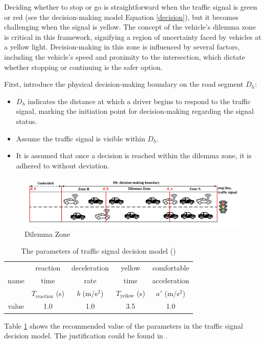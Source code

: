 Deciding whether to stop or go is straightforward when the traffic signal is green or red (see the decision-making model Equation \ref{decision}), but it becomes challenging when the signal is yellow. The concept of the vehicle's dilemma zone is critical in this framework, signifying a region of uncertainty faced by vehicles at a yellow light. Decision-making in this zone is influenced by several factors, including the vehicle's speed and proximity to the intersection, which dictate whether stopping or continuing is the safer option.

First, introduce the physical decision-making boundary on the road segment $D_h$: 
\begin{itemize}
    \item $D_h$ indicates the distance at which a driver begins to respond to the traffic signal, marking the initiation point for decision-making regarding the signal status.
    \item Assume the traffic signal is visible within \(D_h\). 
    \item It is assumed that once a decision is reached within the dilemma zone, it is adhered to without deviation.
\end{itemize}


\begin{figure}[!htbp]
    \centering
    \includegraphics[width= 0.85\linewidth]{figures/dilemma zone1.png}
    \caption{Dilemma Zone}
    \label{fig: Dilemma Zone}
\end{figure}

\begin{table}[htp]
\small
    \centering
    \begin{tabular}{ccccc}
    \toprule
         &    reaction   &  deceleration   & yellow   & comfortable   \\
        name &  time  &   rate  &  time  &  acceleration  \\
         &  $T_{\text{reaction}}$ (s)& $b$ (m/s$^2$) & $T_{\text{yellow}}$ (s) & $a'$ (m/s$^2$) \\
        \hline
         value & 1.0 & 1.0 & 3.5 & 1.0 \\
         \toprule
    \end{tabular}
    \caption{The parameters of traffic signal decision model (\textcite{gates2007analysis})}
    \label{parameters of traffic signal decision model }
\end{table}
Table \ref{parameters of traffic signal decision model } shows the recommended value of the parameters in the traffic signal decision model. The justification could be found in \textcite{gates2007analysis}.

